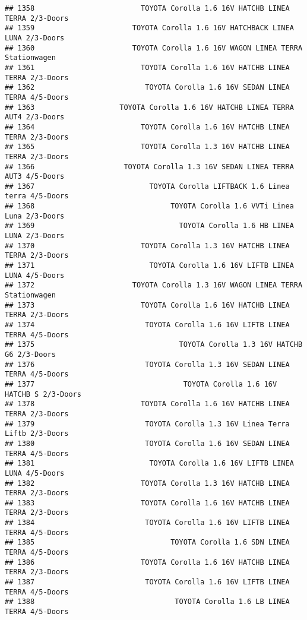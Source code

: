 \documentclass[]{article}
\begin{document}
\begin{verbatim}
## 1358                         TOYOTA Corolla 1.6 16V HATCHB LINEA TERRA 2/3-Doors
## 1359                       TOYOTA Corolla 1.6 16V HATCHBACK LINEA LUNA 2/3-Doors
## 1360                       TOYOTA Corolla 1.6 16V WAGON LINEA TERRA Stationwagen
## 1361                         TOYOTA Corolla 1.6 16V HATCHB LINEA TERRA 2/3-Doors
## 1362                          TOYOTA Corolla 1.6 16V SEDAN LINEA TERRA 4/5-Doors
## 1363                    TOYOTA Corolla 1.6 16V HATCHB LINEA TERRA AUT4 2/3-Doors
## 1364                         TOYOTA Corolla 1.6 16V HATCHB LINEA TERRA 2/3-Doors
## 1365                         TOYOTA Corolla 1.3 16V HATCHB LINEA TERRA 2/3-Doors
## 1366                     TOYOTA Corolla 1.3 16V SEDAN LINEA TERRA AUT3 4/5-Doors
## 1367                           TOYOTA Corolla LIFTBACK 1.6 Linea terra 4/5-Doors
## 1368                                TOYOTA Corolla 1.6 VVTi Linea Luna 2/3-Doors
## 1369                                  TOYOTA Corolla 1.6 HB LINEA LUNA 2/3-Doors
## 1370                         TOYOTA Corolla 1.3 16V HATCHB LINEA TERRA 2/3-Doors
## 1371                           TOYOTA Corolla 1.6 16V LIFTB LINEA LUNA 4/5-Doors
## 1372                       TOYOTA Corolla 1.3 16V WAGON LINEA TERRA Stationwagen
## 1373                         TOYOTA Corolla 1.6 16V HATCHB LINEA TERRA 2/3-Doors
## 1374                          TOYOTA Corolla 1.6 16V LIFTB LINEA TERRA 4/5-Doors
## 1375                                  TOYOTA Corolla 1.3 16V HATCHB G6 2/3-Doors
## 1376                          TOYOTA Corolla 1.3 16V SEDAN LINEA TERRA 4/5-Doors
## 1377                                   TOYOTA Corolla 1.6 16V HATCHB S 2/3-Doors
## 1378                         TOYOTA Corolla 1.6 16V HATCHB LINEA TERRA 2/3-Doors
## 1379                          TOYOTA Corolla 1.3 16V Linea Terra Liftb 2/3-Doors
## 1380                          TOYOTA Corolla 1.6 16V SEDAN LINEA TERRA 4/5-Doors
## 1381                           TOYOTA Corolla 1.6 16V LIFTB LINEA LUNA 4/5-Doors
## 1382                         TOYOTA Corolla 1.3 16V HATCHB LINEA TERRA 2/3-Doors
## 1383                         TOYOTA Corolla 1.6 16V HATCHB LINEA TERRA 2/3-Doors
## 1384                          TOYOTA Corolla 1.6 16V LIFTB LINEA TERRA 4/5-Doors
## 1385                                TOYOTA Corolla 1.6 SDN LINEA TERRA 4/5-Doors
## 1386                         TOYOTA Corolla 1.6 16V HATCHB LINEA TERRA 2/3-Doors
## 1387                          TOYOTA Corolla 1.6 16V LIFTB LINEA TERRA 4/5-Doors
## 1388                                 TOYOTA Corolla 1.6 LB LINEA TERRA 4/5-Doors

\end{verbatim}
\end{document}

